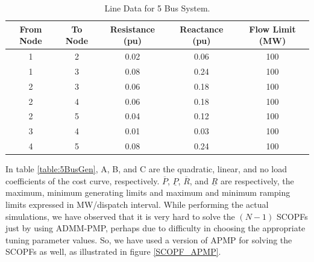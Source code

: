 \documentclass[preprint,12pt,3p]{elsarticle}
\begin{document}
\begin{table}[ht] 

\caption{Line Data for 5 Bus System.} %

\centering %

\begin{tabular}{| c | c | c | c | c |} %

\hline\hline %

From Node & To Node & Resistance (pu) & Reactance (pu)  & Flow Limit (MW) \\ [0.5ex] %


\hline %
1  &	2  &	0.02  &	0.06  &		100 \\ [0.5ex] %
\hline
1  &	3  &	0.08  &	0.24  &		100 \\ [0.5ex] %
\hline
2  &	3  &	0.06  &	0.18  &		100 \\ [0.5ex] %
\hline
2  &	4  &	0.06  &	0.18  &		100 \\ [0.5ex] %
\hline
2  &	5  &	0.04  &	0.12  &		100 \\ [0.5ex] %
\hline
3  &	4  &	0.01  &	0.03  &		100 \\ [0.5ex] %
\hline
4  &	5  &	0.08  &	0.24  &		100 \\ [0.5ex] %
\hline
\end{tabular} 

\label{table:5BusLine} %

\end{table}
In table \ref{table:5BusGen}, A, B, and C are the quadratic, linear, and no load coefficients of the cost curve, respectively. $\overline{P}$, $\underline{P}$, $\overline{R}$, and $\underline{R}$ are respectively, the maximum, minimum generating limits and maximum and minimum ramping limits expressed in MW/dispatch interval. While performing the actual simulations, we have observed that it is very hard to solve the $(N-1)$ SCOPFs just by using ADMM-PMP, perhaps due to difficulty in choosing the appropriate tuning parameter values. So, we have used a version of APMP for solving the SCOPFs as well, as illustrated in figure \ref{SCOPF_APMP}. 
\end{document}
